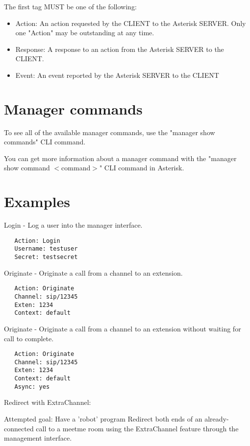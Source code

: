 The first tag MUST be one of the following:

\begin{itemize}
    \item Action: An action requested by the CLIENT to the Asterisk SERVER. 
        Only one "Action" may be outstanding at any time.
    \item Response: A response to an action from the Asterisk SERVER to the CLIENT.
    \item Event: An event reported by the Asterisk SERVER to the CLIENT
\end{itemize}

\section{Manager commands}

To see all of the available manager commands, use the "manager show commands"
CLI command.

You can get more information about a manager command
with the "manager show command $<$command$>$" CLI command in Asterisk.

\section{Examples}

Login - Log a user into the manager interface.

\begin{verbatim}
   Action: Login
   Username: testuser
   Secret: testsecret
\end{verbatim}

Originate - Originate a call from a channel to an extension.

\begin{verbatim}
   Action: Originate
   Channel: sip/12345
   Exten: 1234
   Context: default
\end{verbatim}

Originate - Originate a call from a channel to an extension without waiting
for call to complete.

\begin{verbatim}
   Action: Originate
   Channel: sip/12345
   Exten: 1234
   Context: default
   Async: yes
\end{verbatim}

Redirect with ExtraChannel:

  Attempted goal:
  Have a 'robot' program Redirect both ends of an already-connected call
  to a meetme room using the ExtraChannel feature through the management interface.

